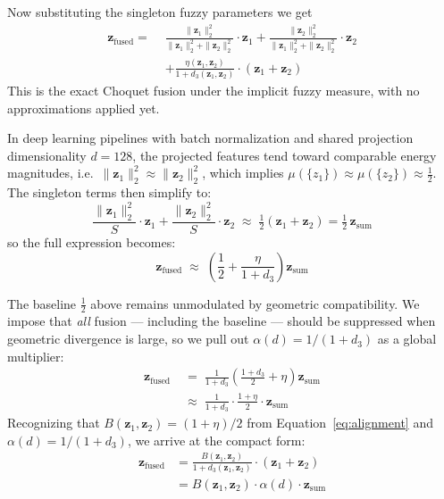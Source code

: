 \documentclass[12pt]{article}
\begin{document}
Now substituting the singleton fuzzy parameters we get
\begin{equation*}
\begin{aligned}
    \mathbf{z}_{\text{fused}} = \,\, & 
        \frac{\|\mathbf{z}_1\|_2^2}{\|\mathbf{z}_1\|_2^2 + \|\mathbf{z}_2\|_2^2} \cdot \mathbf{z}_1 + 
        \frac{\|\mathbf{z}_2\|_2^2}{\|\mathbf{z}_1\|_2^2 + \|\mathbf{z}_2\|_2^2} \cdot \mathbf{z}_2
     \\
    & + 
        \frac{\eta(\mathbf{z}_1, \mathbf{z}_2)}{1 + d_3(\mathbf{z}_1, \mathbf{z}_2)} \cdot (\mathbf{z}_1 + \mathbf{z}_2)
\end{aligned}
\end{equation*}
This is the exact Choquet fusion under the implicit fuzzy measure, with no approximations applied yet.

In deep learning pipelines with batch normalization and shared projection dimensionality $d{=}128$, the projected features tend toward comparable energy magnitudes, i.e.\ $\|\mathbf{z}_1\|_2^2 \approx \|\mathbf{z}_2\|_2^2$, which implies $\mu(\{z_1\}) \approx \mu(\{z_2\}) \approx \tfrac{1}{2}$. The singleton terms then simplify to:
\begin{equation*}
    \frac{\|\mathbf{z}_1\|_2^2}{S}\cdot\mathbf{z}_1 + \frac{\|\mathbf{z}_2\|_2^2}{S}\cdot\mathbf{z}_2 \;\approx\; \tfrac{1}{2}(\mathbf{z}_1+\mathbf{z}_2) = \tfrac{1}{2}\,\mathbf{z}_{\text{sum}}
\end{equation*}
so the full expression becomes:
\begin{equation*}
    \mathbf{z}_{\text{fused}} \;\approx\; \left(\frac{1}{2} + \frac{\eta}{1+d_3}\right)\mathbf{z}_{\text{sum}}
\end{equation*}

The baseline $\tfrac{1}{2}$ above remains unmodulated by geometric compatibility. We impose that \emph{all} fusion — including the baseline — should be suppressed when geometric divergence is large, so we pull out $\alpha(d) = 1/(1+d_3)$ as a global multiplier:
\begin{align*}
    \mathbf{z}_{\text{fused}} &\;=\; \frac{1}{1+d_3}\!\left(\frac{1+d_3}{2} + \eta\right)\mathbf{z}_{\text{sum}} \\[6pt]
                               &\;\approx\; \frac{1}{1+d_3}\cdot\frac{1+\eta}{2}\cdot\mathbf{z}_{\text{sum}}
\end{align*}
Recognizing that $B(\mathbf{z}_1,\mathbf{z}_2) = (1+\eta)/2$ from Equation~\eqref{eq:alignment} and $\alpha(d) = 1/(1+d_3)$, we arrive at the compact form:
\begin{equation*}
\begin{aligned}
\mathbf{z}_{\text{fused}} 
&= \frac{B(\mathbf{z}_1,\mathbf{z}_2)}{1+d_3(\mathbf{z}_1,\mathbf{z}_2)}
   \cdot(\mathbf{z}_1+\mathbf{z}_2) \\[4pt]
&= B(\mathbf{z}_1,\mathbf{z}_2)\cdot\alpha(d)\cdot\mathbf{z}_{\text{sum}}
\end{aligned}
\end{equation*}
\end{document}
